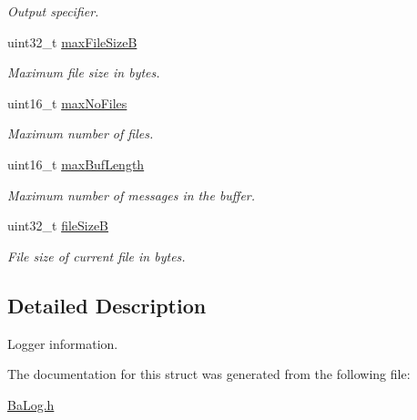 \begin{DoxyCompactItemize}
\begin{DoxyCompactList}\small\item\em Output specifier. \end{DoxyCompactList}\item 
uint32\+\_\+t \hyperlink{structTBaLogInfo_aa3bf9b90409a8e9e83696ab940efd522}{max\+File\+SizeB}\hypertarget{structTBaLogInfo_aa3bf9b90409a8e9e83696ab940efd522}{}\label{structTBaLogInfo_aa3bf9b90409a8e9e83696ab940efd522}

\begin{DoxyCompactList}\small\item\em Maximum file size in bytes. \end{DoxyCompactList}\item 
uint16\+\_\+t \hyperlink{structTBaLogInfo_adbd1ecdf038ce3e82990c26e3f9810e2}{max\+No\+Files}\hypertarget{structTBaLogInfo_adbd1ecdf038ce3e82990c26e3f9810e2}{}\label{structTBaLogInfo_adbd1ecdf038ce3e82990c26e3f9810e2}

\begin{DoxyCompactList}\small\item\em Maximum number of files. \end{DoxyCompactList}\item 
uint16\+\_\+t \hyperlink{structTBaLogInfo_adc7f0a818941399d8b8e69aa005863ae}{max\+Buf\+Length}\hypertarget{structTBaLogInfo_adc7f0a818941399d8b8e69aa005863ae}{}\label{structTBaLogInfo_adc7f0a818941399d8b8e69aa005863ae}

\begin{DoxyCompactList}\small\item\em Maximum number of messages in the buffer. \end{DoxyCompactList}\item 
uint32\+\_\+t \hyperlink{structTBaLogInfo_a16fdaba7033102060e6ceb3c4d8d70b6}{file\+SizeB}\hypertarget{structTBaLogInfo_a16fdaba7033102060e6ceb3c4d8d70b6}{}\label{structTBaLogInfo_a16fdaba7033102060e6ceb3c4d8d70b6}

\begin{DoxyCompactList}\small\item\em File size of current file in bytes. \end{DoxyCompactList}\end{DoxyCompactItemize}


\subsection{Detailed Description}
Logger information. 

The documentation for this struct was generated from the following file\+:\begin{DoxyCompactItemize}
\item 
\hyperlink{BaLog_8h}{Ba\+Log.\+h}\end{DoxyCompactItemize}
